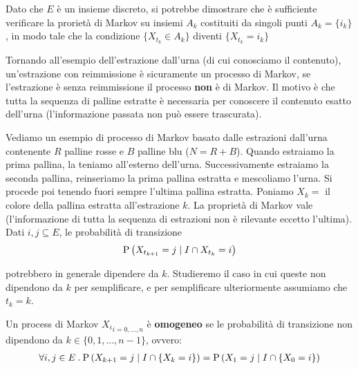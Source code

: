 \begin{note}
	Dato che $ E $ \`e un insieme discreto, si potrebbe dimostrare che \`e sufficiente verificare la proriet\`a di Markov su insiemi $ A_k $ costituiti da singoli punti $ A_k = \{i_k\} $, in modo tale che la condizione $ \{X_{t_k} \in A_k\} $ diventi $ \{X_{t_k} = i_k\} $
\end{note}

\begin{exmp}
	Tornando all'esempio dell'estrazione dall'urna (di cui conosciamo il contenuto), un'estrazione con reimmissione \`e sicuramente un processo di Markov, se l'estrazione \`e senza reimmissione il processo \textbf{non} \`e di Markov. Il motivo \`e che tutta la sequenza di palline estratte \`e necessaria per conoscere il contenuto esatto dell'urna (l'informazione passata non pu\`o essere trascurata).
\end{exmp}

\begin{exmp}
	Vediamo un esempio di processo di Markov basato dalle estrazioni dall'urna contenente $ R $ palline rosse e $ B $ palline blu ($ N = R+B $). Quando estraiamo la prima pallina, la teniamo all'esterno dell'urna. Successivamente estraiamo la seconda pallina, reinseriamo la prima pallina estratta e mescoliamo l'urna. Si procede poi tenendo fuori sempre l'ultima pallina estratta. Poniamo $ X_k = $ il colore della pallina estratta all'estrazione $ k $. La propriet\`a di Markov vale (l'informazione di tutta la sequenza di estrazioni non \`e rilevante eccetto l'ultima). Dati $ i,j \subseteq E $, le probabilit\`a di transizione
	\begin{equation*}
		\text{P}\left(X_{t_{k+1}} = j \mid I \cap X_{t_k} = i\right)
	\end{equation*}
	
	potrebbero in generale dipendere da $ k $. Studieremo il caso in cui queste non dipendono da $ k $ per semplificare, e per semplificare ulteriormente assumiamo che $ t_k = k $.
\end{exmp}

\begin{defn}
	Un process di Markov $ {X_i}_{i=0,\hdots,n} $ \`e \textbf{omogeneo} se le probabilit\`a di transizione non dipendono da $ k \in \{0, 1, \hdots, n-1\} $, ovvero:
	\begin{equation*}
	\begin{aligned}
		\forall i,j \in E \> . \> \text{P}\left(X_{k+1} = j \mid I \cap \{X_k = i\}\right) = \text{P}\left(X_1 = j \mid I \cap \{X_0 = i\}\right)
	\end{aligned}
	\end{equation*}
\end{defn}


